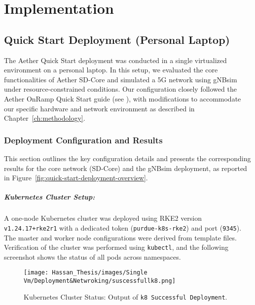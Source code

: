 \chapter{Implementation}
\label{ch:implementation_testing}

\section{Quick Start Deployment (Personal Laptop)}

The Aether Quick Start deployment was conducted in a single virtualized environment on a personal laptop. In this setup, we evaluated the core functionalities of Aether SD-Core and simulated a 5G network using gNBsim under resource-constrained conditions. Our configuration closely followed the Aether OnRamp Quick Start guide (see \cite{onramp_docs}), with modifications to accommodate our specific hardware and network environment as described in Chapter~\ref{ch:methodology}.

\subsection{Deployment Configuration and Results}
\label{subsec:sdcore-gnbsim-results}

This section outlines the key configuration details and presents the corresponding results for the core network (SD-Core) and the gNBsim deployment,  as reported in Figure~\ref{fig:quick-start-deployment-overview}.

\paragraph{Kubernetes Cluster Setup:}  
A one-node Kubernetes cluster was deployed using RKE2 version \texttt{v1.24.17+rke2r1} with a dedicated token (\texttt{purdue-k8s-rke2}) and port (\texttt{9345}). The master and worker node configurations were derived from template files. Verification of the cluster was performed using \texttt{kubectl}, and the following screenshot shows the status of all pods across namespaces.

\begin{figure}[H]
    \centering
    \texttt{[image: Hassan\_Thesis/images/Single Vm/Deployment\&Netwroking/suscessfullk8.png]}
    \caption{Kubernetes Cluster Status: Output of \texttt{k8 Successful Deployment}.}
    \label{fig:k8s_cluster_status}
\end{figure}

